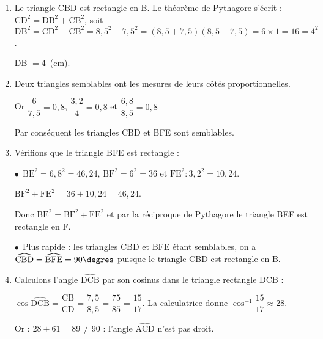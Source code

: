 
\medskip

\begin{enumerate}
\item Le triangle CBD est rectangle en B. Le théorème de Pythagore s'écrit  :
$\text{CD}^2 = \text{DB}^2 + \text{CB}^2$, soit $\text{DB}^2 = \text{CD}^2 - \text{CB}^2 = 8,5^2 - 7,5^2 = (8,5 + 7,5)(8,5 - 7,5) = 6 \times 1 = 16 = 4^2$.

DB $ = 4$~(cm).
\item Deux triangles semblables ont les mesures de leurs côtés proportionnelles.

Or $\dfrac{6}{7,5} = 0,8$, \quad $\dfrac{3,2}{4} = 0,8$ et $\dfrac{6,8}{8,5} = 0,8$

Par conséquent les triangles CBD et BFE sont semblables.
\item Vérifions que le triangle BFE est rectangle :

$\bullet~~$$\text{BE}^2 = 6,8^2 = 46,24$, \quad $\text{BF}^2 = 6^2 = 36$ et $\text{FE}^2 : 3,2^2 = 10,24$.

$\text{BF}^2 + \text{FE}^2 = 36 + 10,24 = 46,24$.

Donc $\text{BE}^2 = \text{BF}^2 + \text{FE}^2$ et par la réciproque de Pythagore le triangle BEF est rectangle en F.

$\bullet~~$Plus rapide : les triangles CBD et BFE étant semblables, on a $\widehat{\text{CBD}} = \widehat{\text{BFE}} = 90\degres$ puisque le triangle CBD est rectangle en B.
\item  Calculons l'angle $\widehat{\text{DCB}}$ par son cosinus dans le triangle rectangle DCB :

$\cos \widehat{\text{DCB}} = \dfrac{\text{CB}}{\text{CD}}  = \dfrac{7,5}{8,5} = \dfrac{75}{85} = \dfrac{15}{17}$. La calculatrice donne $\cos ^{-1} \dfrac{15}{17} \approx 28$\degres.

Or : $28 + 61  = 89 \neq 90$ : l'angle $\widehat{\text{ACD}}$ n'est pas droit.
\end{enumerate}

\bigskip

